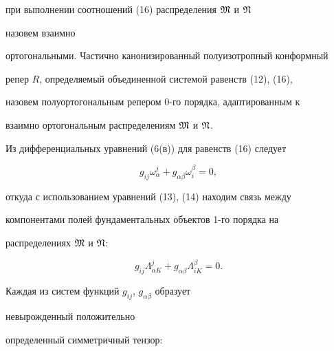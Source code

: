при выполнении соотношений (16) распределения $\frak M$ и $\frak N$ 


назовем взаимно 


ортогональными. Частично канонизированный полуизотропный конформный 


репер $R$, определяемый объединенной системой равенств (12), (16), 


назовем полуортогональным репером $0$-го порядка, адаптированным к 


взаимно ортогональным распределениям $\frak M$ и $\frak N$. 


 


Из дифференциальных уравнений (6(в)) для равенств (16) следует 


$$ 


g_{ij}\omega^j_\alpha+g_{\alpha\beta}\omega^\beta_i=0, 


$$ 


откуда с использованием уравнений (13), (14) находим связь между 


компонентами полей фундаментальных объектов 1-го порядка на 


распределениях $\frak M$ и $\frak N$: 


\begin{equation} 


g_{ij}\Lambda^j_{\alpha K}+g_{\alpha\beta}\Lambda^\beta_{iK}=0. 


\end{equation} 


 


Каждая из систем функций $g_{ij}$, $g_{\alpha\beta}$ образует 


невырожденный положительно 


определенный симметричный тензор: 


